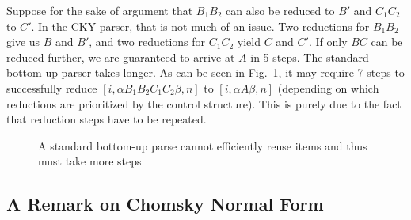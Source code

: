 Suppose for the sake of argument that $B_1 B_2$ can also be reduced to $B'$ and $C_1 C_2$ to $C'$.
In the CKY parser, that is not much of an issue.
Two reductions for $B_1 B_2$ give us $B$ and $B'$, and two reductions for $C_1 C_2$ yield $C$ and $C'$.
If only $B C$ can be reduced further, we are guaranteed to arrive at $A$ in 5 steps.
The standard bottom-up parser takes longer.
As can be seen in Fig.~\ref{fig:Chart_BottomUpExtraSteps}, it may require 7 steps to successfully reduce $[i,\alpha B_1 B_2 C_1 C_2 \beta, n]$ to $[i,\alpha A \beta, n]$ (depending on which reductions are prioritized by the control structure).
This is purely due to the fact that reduction steps have to be repeated.
%
\begin{figure}
    \centering
\caption{A standard bottom-up parse cannot efficiently reuse items and thus must take more steps}
\label{fig:Chart_BottomUpExtraSteps}
\end{figure}

\subsection{A Remark on Chomsky Normal Form}

